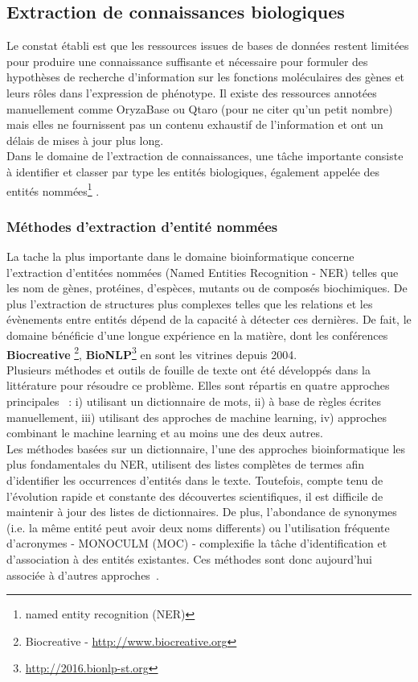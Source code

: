 \subsection{Extraction de connaissances biologiques}

Le constat établi est que les ressources issues de bases de données restent limitées pour produire une connaissance suffisante et nécessaire pour formuler des hypothèses de recherche d’information sur les fonctions moléculaires des gènes et leurs rôles dans l’expression de phénotype. Il existe des ressources annotées manuellement comme OryzaBase ou Qtaro (pour ne citer qu'un petit nombre) mais elles ne fournissent pas un contenu exhaustif de l'information et ont un délais de mises à jour plus long. \\

Dans le domaine de l’extraction de connaissances, une tâche importante consiste à identifier et classer par type les entités biologiques, également appelée des entités nommées\footnote{named entity recognition (NER)} .

\subsubsection{Méthodes d'extraction d'entité nommées}
La tache la plus importante dans le domaine bioinformatique concerne l'extraction d'entitées nommées (Named Entities Recognition  - NER) telles que les nom de gènes, protéines, d'espèces, mutants ou de composés biochimiques. De plus l'extraction de structures plus complexes telles que les relations  et les évènements entre entités dépend de la capacité à détecter ces dernières. De fait, le domaine bénéficie d'une longue expérience en la matière, dont les conférences  \textbf{Biocreative} \footnote{Biocreative - \url{http://www.biocreative.org}}, \textbf{BioNLP}\footnote{\url{http://2016.bionlp-st.org}} en sont les vitrines depuis 2004.\\
Plusieurs méthodes et outils de fouille de texte ont été développés dans la littérature pour résoudre ce problème. Elles sont répartis en quatre approches principales~\cite{Basaldella2017} : i)  utilisant un dictionnaire de mots, ii)  à base de règles écrites manuellement, iii) utilisant des approches de machine learning, iv) approches combinant le machine learning et au moins une des deux autres.\\

Les méthodes basées sur un dictionnaire, l'une des approches bioinformatique les plus fondamentales du NER, utilisent des listes complètes de termes afin d'identifier les occurrences d'entités dans le texte. Toutefois, compte tenu de l'évolution rapide et constante des découvertes scientifiques, il est difficile de maintenir à jour des listes de dictionnaires. De plus, l'abondance de synonymes (i.e. la même entité peut avoir deux noms differents) ou l'utilisation fréquente d'acronymes - MONOCULM (MOC) - complexifie la tâche d'identification et d'association à des entités existantes. Ces méthodes sont donc aujourd'hui associée à d'autres approches~\cite{Hettne2009,Gerner2010}. \\

